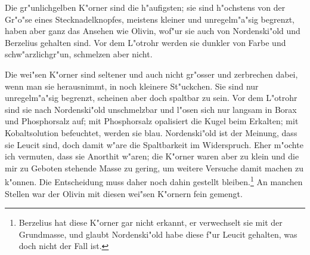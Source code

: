 \documentclass[a4paper, 11pt, oneside]{article}
\begin{document}
Die gr"unlichgelben K"orner sind die h"aufigsten; sie sind h"ochstens von der Gr"o"se eines Stecknadelknopfes, meistens kleiner und unregelm"a"sig begrenzt, haben aber ganz das Ansehen wie Olivin, wof"ur sie auch von Nordenski"old und Berzelius gehalten sind. Vor dem L"otrohr werden sie dunkler von Farbe und schw"arzlichgr"un, schmelzen aber nicht.

Die wei"sen K"orner sind seltener und auch nicht gr"osser und zerbrechen dabei, wenn man sie herausnimmt, in noch kleinere St"uckchen. Sie sind nur unregelm"a"sig begrenzt, scheinen aber doch spaltbar zu sein. Vor dem L"otrohr sind sie nach Nordenski"old unschmelzbar und l"osen sich nur langsam in Borax und Phosphorsalz auf; mit Phosphorsalz opalisiert die Kugel beim Erkalten; mit Kobaltsolution befeuchtet, werden sie blau. Nordenski"old ist der Meinung, dass sie Leucit sind, doch damit w"are die Spaltbarkeit im Widerspruch. Eher m"ochte ich vermuten, dass sie Anorthit w"aren; die K"orner waren aber zu klein und die mir zu Geboten stehende Masse zu gering, um weitere Versuche damit machen zu k"onnen. Die Entscheidung muss daher noch dahin gestellt bleiben.\footnote{Berzelius hat diese K"orner gar nicht erkannt, er verwechselt sie mit der Grundmasse, und glaubt Nordenski"old habe diese f"ur Leucit gehalten, was doch nicht der Fall ist.} An manchen Stellen war der Olivin mit diesen wei"sen K"ornern fein gemengt.
\end{document}
